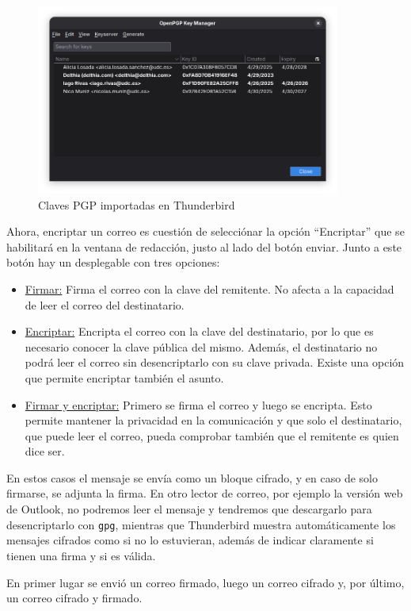 \begin{figure}[H]
    \centering
    \includegraphics[width=10cm]{thunderbird-keymanager-keys.png}
    \caption{Claves PGP importadas en Thunderbird}
\end{figure}

Ahora, encriptar un correo es cuestión de selecciónar la opción “Encriptar” que se habilitará en la ventana de redacción, justo al lado del botón enviar. Junto a este botón hay un desplegable con tres opciones:
\begin{itemize}
    \item{\underline{Firmar:} Firma el correo con la clave del remitente. No afecta a la capacidad de leer el correo del destinatario.}
    \item{\underline{Encriptar:} Encripta el correo con la clave del destinatario, por lo que es necesario conocer la clave pública del mismo. Además, el destinatario no podrá leer el correo sin desencriptarlo con su clave privada. Existe una opción que permite encriptar también el asunto.}
    \item{\underline{Firmar y encriptar:} Primero se firma el correo y luego se encripta. Esto permite mantener la privacidad en la comunicación y que solo el destinatario, que puede leer el correo, pueda comprobar también que el remitente es quien dice ser.}
\end{itemize}

En estos casos el mensaje se envía como un bloque cifrado, y en caso de solo firmarse, se adjunta la firma. En otro lector de correo, por ejemplo la versión web de Outlook, no podremos leer el mensaje y tendremos que descargarlo para desencriptarlo con \texttt{gpg}, mientras que Thunderbird muestra automáticamente los mensajes cifrados como si no lo estuvieran, además de indicar claramente si tienen una firma y si es válida.

En primer lugar se envió un correo firmado, luego un correo cifrado y, por último, un correo cifrado y firmado.

